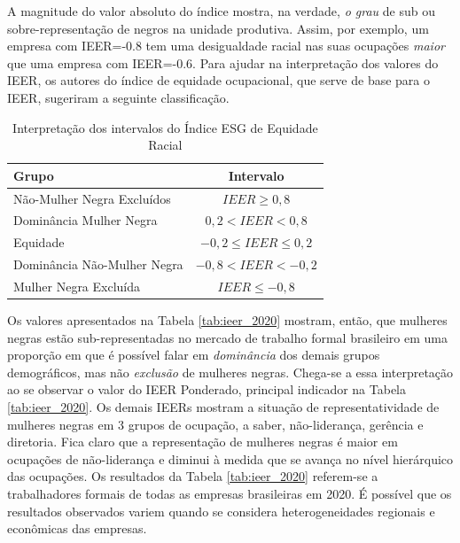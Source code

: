 \documentclass[12pt]{article}
\begin{document}
\par A magnitude do valor absoluto do índice mostra, na verdade, \textit{o grau} de sub ou sobre-representação de negros na unidade produtiva. Assim, por exemplo, um empresa com IEER=-0.8 tem uma desigualdade racial nas suas ocupações \textit{maior} que uma empresa com IEER=-0.6. Para ajudar na interpretação dos valores do IEER, os autores do índice de equidade ocupacional, que serve de base para o IEER, sugeriram a seguinte classificação.\autocite{ransom2001one}

\begin{table}[htb!]
\centering
\caption{Interpretação dos intervalos do Índice ESG de Equidade Racial}
\begin{tabular}{lc}
\hline
Grupo             & Intervalo                 \\ \hline
Não-Mulher Negra Excluídos & $IEER \geq 0, 8 $               \\
Dominância Mulher Negra  & $0,2 < IEER < 0,8$   \\
Equidade          & $-0,2\leq IEER \leq 0,2$  \\
Dominância Não-Mulher Negra & $-0,8 < IEER < -0,2$ \\
Mulher Negra Excluída  & $IEER \leq -0,8$        \\ \hline
\end{tabular}
\end{table}

\par Os valores apresentados na Tabela \ref{tab:ieer_2020} mostram, então, que mulheres negras estão sub-representadas no mercado de trabalho formal brasileiro em uma proporção em que é possível falar em \textit{dominância} dos demais grupos de\-mo\-grá\-fi\-cos, mas não \textit{exclusão} de mulheres negras. Chega-se a essa interpretação ao se observar o valor do IEER Ponderado, principal indicador na Tabela \ref{tab:ieer_2020}. Os demais IEERs mostram a situação de representatividade de mulheres negras em 3 grupos de ocupação, a saber, não-liderança, gerência e diretoria. Fica claro que a representação de mulheres negras é maior em ocupações de não-liderança e diminui à medida que se avança no nível hierárquico das ocupações. Os resultados da Tabela \ref{tab:ieer_2020} referem-se a trabalhadores formais de todas as empresas brasileiras em 2020. É possível que os resultados observados variem quando se considera heterogeneidades regionais e econômicas das empresas.


\end{document}
